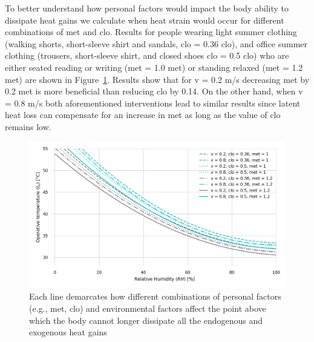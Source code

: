 To better understand how personal factors would impact the body ability to dissipate heat gains we calculate when heat strain would occur for different combinations of \ac{met} and \ac{clo}.
Results for people wearing light summer clothing (walking shorts, short-sleeve shirt and sandals, \acs{clo} = 0.36 clo), and office summer clothing (trousers, short-sleeve shirt, and closed shoes \acs{clo} = 0.5 clo) who are either seated reading or writing (\ac{met} = 1.0 met) or standing relaxed (\ac{met} = 1.2 met) are shown in Figure~\ref{fig:met_clo}.
Results show that for \ac{v} = 0.2 m/s decreasing \ac{met} by 0.2 met is more beneficial than reducing \ac{clo} by 0.14.
On the other hand, when \ac{v} = 0.8 m/s both aforementioned interventions lead to similar results since latent heat loss can compensate for an increase in \ac{met} as long as the value of \ac{clo} remains low.

\begin{figure}[thb!]
    \centering
    \includegraphics[width=\textwidth]{figures/met_clo.png}
    \caption{Each line demarcates how different combinations of personal factors (e.g., \ac{met}, \ac{clo}) and environmental factors affect the point above which the body cannot longer dissipate all the endogenous and exogenous heat gains}
    \label{fig:met_clo}
\end{figure}

